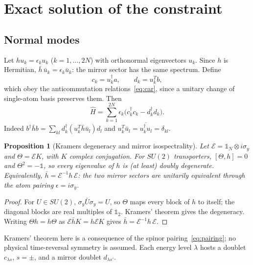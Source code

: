 \documentclass[reprint,aps,prd,amsmath,amssymb,superscriptaddress,nofootinbib,floatfix]{revtex4-2}
\theoremstyle{plain}
\newtheorem{proposition}{Proposition}
\theoremstyle{definition}
\theoremstyle{remark}
\newcommand{\Hc}{\hat{H}}
\newcommand{\one}{\mathbb{1}}
\newcommand{\SU}{SU(2)}
\begin{document}
\section{Exact solution of the constraint}
\label{sec:solution}

\subsection{Normal modes}

Let $hu_k=\epsilon_ku_k$ ($k=1,\ldots,2N$) with orthonormal eigenvectors $u_k$. Since $h$ is Hermitian,
$\bar h\,\bar u_k=\epsilon_k\bar u_k$: the mirror sector has the same spectrum. Define
\begin{equation}
c_k=u_k^\dagger a,\qquad d_k=u_k^{T}b ,
\label{eq:normal}
\end{equation}
which obey the anticommutation relations~\eqref{eq:car}, since a unitary change of single-atom basis preserves them. Then
\begin{equation}
\Hc=\sum_{k=1}^{2N}\epsilon_k\big(c_k^\dagger c_k-d_k^\dagger d_k\big).
\label{eq:Hdiag}
\end{equation}
Indeed $b^\dagger\bar hb=\sum_{kl}d_k^\dagger(u_k^T\bar h\bar u_l)d_l$ and
$u_k^T\bar u_l=\overline{u_k^\dagger u_l}=\delta_{kl}$.

\begin{proposition}[Kramers degeneracy and mirror isospectrality]
\label{prop:kramers}
Let $\mathcal{E}=\one_N\otimes i\sigma_y$ and $\Theta=\mathcal{E}K$, with $K$ complex conjugation. For $\SU$ transporters,
$[\Theta,h]=0$ and $\Theta^2=-\one$, so every eigenvalue of $h$ is (at least) doubly degenerate. Equivalently,
$\bar h=\mathcal{E}^{-1}h\,\mathcal{E}$: the two mirror sectors are unitarily equivalent through the atom pairing
$\epsilon=i\sigma_y$.
\end{proposition}
\begin{proof}
For $U\in\SU$, $\sigma_y\bar U\sigma_y=U$, so $\Theta$ maps every block of $h$ to itself; the diagonal
blocks are real multiples of $\one_2$. Kramers' theorem gives the degeneracy. Writing $\Theta h=h\Theta$ as
$\mathcal{E}\bar hK=h\mathcal{E}K$ gives $\bar h=\mathcal{E}^{-1}h\,\mathcal{E}$.
\end{proof}
Kramers' theorem here is a consequence of the spinor pairing~\eqref{eq:pairing}; no physical time-reversal
symmetry is assumed.
Each energy level $\lambda$ hosts a doublet $c_{\lambda s}$, $s=\pm$, and a mirror doublet $d_{\lambda s'}$.
\end{document}

